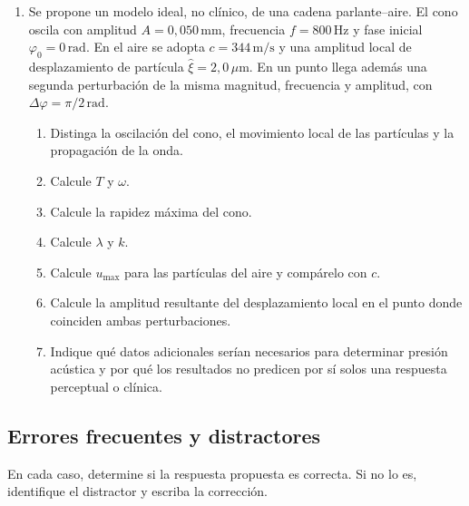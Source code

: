 \begin{enumerate}[label=\textbf{I\arabic*.},leftmargin=*]
    \item Se propone un modelo ideal, no clínico, de una cadena
    parlante--aire. El cono oscila con amplitud
    \(A=0{,}050\,\text{mm}\), frecuencia
    \(f=800\,\text{Hz}\) y fase inicial
    \(\varphi_0=0\,\text{rad}\). En el aire se adopta
    \(c=344\,\text{m}/\text{s}\) y una amplitud local de desplazamiento de
    partícula \(\hat{\xi}=2{,}0\,\mu\text{m}\). En un punto llega además una
    segunda perturbación de la misma magnitud, frecuencia y amplitud, con
    \(\Delta\varphi=\pi/2\,\text{rad}\).
    \begin{enumerate}[label=\alph*)]
        \item Distinga la oscilación del cono, el movimiento local de las
        partículas y la propagación de la onda.
        \item Calcule \(T\) y \(\omega\).
        \item Calcule la rapidez máxima del cono.
        \item Calcule \(\lambda\) y \(k\).
        \item Calcule \(u_{\max}\) para las partículas del aire y compárelo
        con \(c\).
        \item Calcule la amplitud resultante del desplazamiento local en el
        punto donde coinciden ambas perturbaciones.
        \item Indique qué datos adicionales serían necesarios para determinar
        presión acústica y por qué los resultados no predicen por sí solos una
        respuesta perceptual o clínica.
    \end{enumerate}
\end{enumerate}

\subsection*{Errores frecuentes y distractores}

En cada caso, determine si la respuesta propuesta es correcta. Si no lo es,
identifique el distractor y escriba la corrección.

